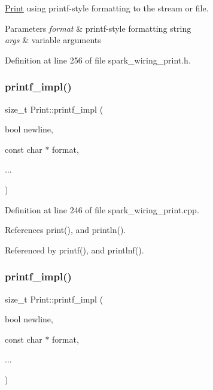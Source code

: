 \hyperlink{class_print}{Print} using printf-\/style formatting to the stream or file. 


\begin{DoxyParams}{Parameters}
{\em format} & printf-\/style formatting string\\
\hline
{\em args} & variable arguments \\
\hline
\end{DoxyParams}


Definition at line 256 of file spark\+\_\+wiring\+\_\+print.\+h.

\mbox{\label{class_print_af887fd768601c2ee2b18d1deb20b151d}} 
\subsubsection{\texorpdfstring{printf\+\_\+impl()}{printf\_impl()}\hspace{0.1cm}{\footnotesize\ttfamily [1/2]}}
{\footnotesize\ttfamily size\+\_\+t Print\+::printf\+\_\+impl (\begin{DoxyParamCaption}\item[{bool}]{newline,  }\item[{const char $\ast$}]{format,  }\item[{}]{... }\end{DoxyParamCaption})\hspace{0.3cm}{\ttfamily [protected]}}



Definition at line 246 of file spark\+\_\+wiring\+\_\+print.\+cpp.



References print(), and println().



Referenced by printf(), and printlnf().

\mbox{\label{class_print_af887fd768601c2ee2b18d1deb20b151d}} 
\subsubsection{\texorpdfstring{printf\+\_\+impl()}{printf\_impl()}\hspace{0.1cm}{\footnotesize\ttfamily [2/2]}}
{\footnotesize\ttfamily size\+\_\+t Print\+::printf\+\_\+impl (\begin{DoxyParamCaption}\item[{bool}]{newline,  }\item[{const char $\ast$}]{format,  }\item[{}]{... }\end{DoxyParamCaption})\hspace{0.3cm}{\ttfamily [protected]}}

